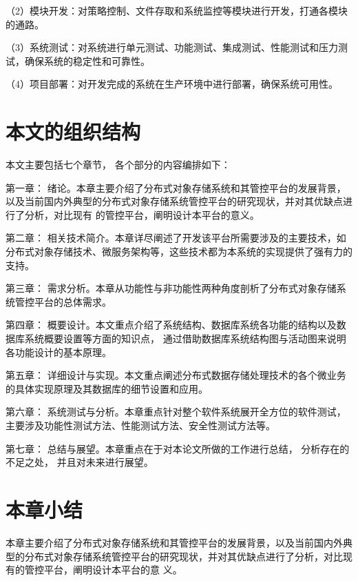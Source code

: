 （2）模块开发：对策略控制、文件存取和系统监控等模块进行开发，打通各模块的通路。

（3）系统测试：对系统进行单元测试、功能测试、集成测试、性能测试和压力测试，确保系统的稳定性和可靠性。

（4）项目部署：对开发完成的系统在生产环境中进行部署，确保系统可用性。

\section{本文的组织结构}

本文主要包括七个章节， 各个部分的内容编排如下： 

第一章： 绪论。本章主要介绍了分布式对象存储系统和其管控平台的发展背景，以及当前国内外典型的分布式对象存储系统管控平台的研究现状，并对其优缺点进行了分析，对比现有
的管控平台，阐明设计本平台的意义。

第二章： 相关技术简介。本章详尽阐述了开发该平台所需要涉及的主要技术，如分布式对象存储技术、微服务架构等，这些技术都为本系统的实现提供了强有力的支持。

第三章： 需求分析。本章从功能性与非功能性两种角度剖析了分布式对象存储系统管控平台的总体需求。

第四章： 概要设计。本文重点介绍了系统结构、数据库系统各功能的结构以及数据库系统概要设置等方面的知识点， 通过借助数据库系统结构图与活动图来说明各功能设计的基本原理。

第五章： 详细设计与实现。本文重点阐述分布式数据存储处理技术的各个微业务的具体实现原理及其数据库的细节设置和应用。

第六章： 系统测试与分析。本章重点针对整个软件系统展开全方位的软件测试， 主要涉及功能性测试方法、性能测试方法、安全性测试方法等。

第七章： 总结与展望。本章重点在于对本论文所做的工作进行总结， 分析存在的不足之处， 并且对未来进行展望。

\section{本章小结}

本章主要介绍了分布式对象存储系统和其管控平台的发展背景，以及当前国内外典型的分布式对象存储系统管控平台的研究现状，并对其优缺点进行了分析，对比现有的管控平台，阐明设计本平台的意
义。